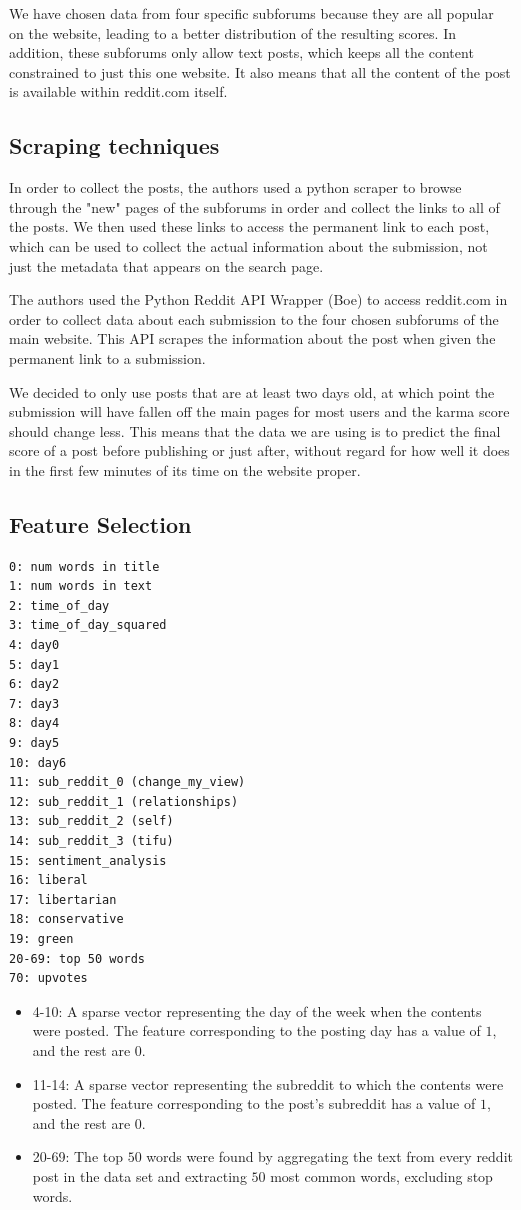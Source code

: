 \documentclass[10pt,twocolumn]{article}
\begin{document}
We have chosen data from four specific subforums because they are all popular on the website, leading to a better distribution of the resulting scores. In addition, these subforums only allow text posts, which keeps all the content constrained to just this one website. It also means that all the content of the post is available within reddit.com itself.

\subsection{Scraping techniques}
In order to collect the posts, the authors used a python scraper to browse through the "new" pages of the subforums in order and collect the links to all of the posts. We then used these links to access the permanent link to each post, which can be used to collect the actual information about the submission, not just the metadata that appears on the search page.

The authors used the Python Reddit API Wrapper (Boe) to access reddit.com in order to collect data about each submission to the four chosen subforums of the main website. This API scrapes the information about the post when given the permanent link to a submission.

We decided to only use posts that are at least two days old, at which point the submission will have fallen off the main pages for most users and the karma score should change less. This means that the data we are using is to predict the final score of a post before publishing or just after, without regard for how well it does in the first few minutes of its time on the website proper.

\subsection{Feature Selection}
\begin{verbatim}
0: num words in title
1: num words in text
2: time_of_day
3: time_of_day_squared
4: day0
5: day1
6: day2
7: day3
8: day4
9: day5
10: day6
11: sub_reddit_0 (change_my_view)
12: sub_reddit_1 (relationships)
13: sub_reddit_2 (self)
14: sub_reddit_3 (tifu)
15: sentiment_analysis
16: liberal
17: libertarian
18: conservative
19: green
20-69: top 50 words
70: upvotes
\end{verbatim}

\begin{itemize}
	\item 4-10:
		A sparse vector representing the day of the week when the contents were posted.
		The feature corresponding to the posting day has a value of $1$, and the rest are $0$.
	\item 11-14:
		A sparse vector representing the subreddit to which the contents were posted.
		The feature corresponding to the post's subreddit has a value of $1$, and the rest are $0$.
	\item 20-69:
		The top $50$ words were found by aggregating the text from every reddit post in the data set and extracting $50$ most common words, excluding stop words.
\end{itemize}
\end{document}
